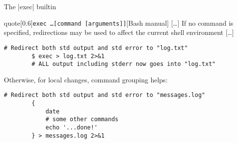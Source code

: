 \begin{frame}[fragile]{The \bash|exec| builtin}
    \vspace{-2mm}
    \begin{varblock}{quote}[0.6\textwidth]{\texttt{exec \ldots [command [arguments]]}}[Bash manual]
        [\ldots] If no command is specified, redirections may be used to affect the current shell environment [\ldots]\smallskip
    \end{varblock}
    \begin{lstlisting}[style=MyBash, numbers=none, belowskip=-4mm]
        # Redirect both std output and std error to "log.txt"
        $ exec > log.txt 2>&1
        # ALL output including stderr now goes into "log.txt"
    \end{lstlisting}
    Otherwise, for local changes, command grouping helps:
    \begin{lstlisting}[style=MyBash, numbers=none, aboveskip=2mm]
        # Redirect both std output and std error to "messages.log"
        {
            date
            # some other commands
            echo '...done!'
        } > messages.log 2>&1
    \end{lstlisting} 
\end{frame}
